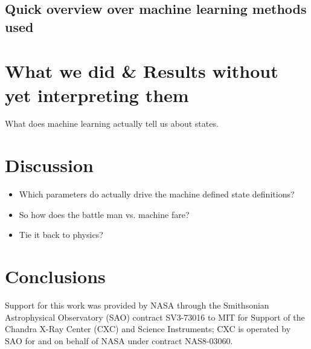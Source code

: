 \documentclass{aa}
\begin{document}
\subsection{Quick overview over machine learning methods used}

\section{What we did \& Results without yet interpreting them}

What does machine learning actually tell us about states.

\section{Discussion}

\begin{itemize}

\item Which parameters do actually drive the machine defined state
  definitions?

\item So how does the battle man vs. machine fare?

\item Tie it back to physics?

\end{itemize}

\section{Conclusions}

\begin{acknowledgements}
  Support for this work was provided by NASA through the Smithsonian
  Astrophysical Observatory (SAO) contract SV3-73016 to MIT for
  Support of the Chandra X-Ray Center (CXC) and Science Instruments;
  CXC is operated by SAO for and on behalf of NASA under contract
  NAS8-03060.
\end{acknowledgements}

 

\end{document}
